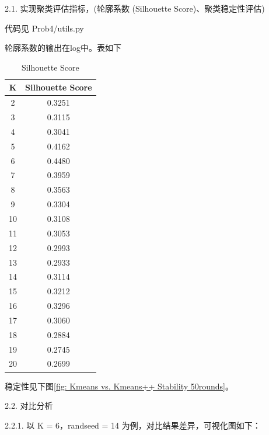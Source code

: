 \documentclass[8pt]{article}
\begin{document}
2.1. 实现聚类评估指标，(轮廓系数 (Silhouette Score)、聚类稳定性评估) 

代码见 {\color{blue}Prob4/utils.py}

轮廓系数的输出在log中。表如下
\begin{table}[H]
    \centering
    \begin{tabular}{|c|c|}
        \hline
        K & Silhouette Score  \\
        \hline
        2 & 0.3251  \\
        3 & 0.3115  \\
        4 & 0.3041  \\
        5 & 0.4162  \\
        6 & 0.4480  \\
        7 & 0.3959  \\
        8 & 0.3563  \\
        9 & 0.3304  \\
        10 & 0.3108  \\
        11 & 0.3053  \\
        12 & 0.2993  \\
        13 & 0.2933  \\
        14 & 0.3114  \\
        15 & 0.3212  \\
        16 & 0.3296  \\
        17 & 0.3060  \\
        18 & 0.2884  \\
        19 & 0.2745  \\
        20 & 0.2699  \\
        \hline
    \end{tabular}
    \caption{Silhouette Score}
\end{table}

稳定性见下图\ref{fig: Kmeans vs. Kmeans++ Stability 50rounds}。

2.2. 对比分析

2.2.1. 以 K = 6，randseed = 14 为例，对比结果差异，可视化图如下：
\end{document}
